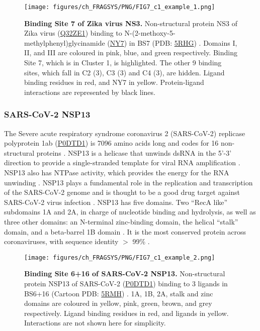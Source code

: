 \begin{figure}[htb!]
    \centering
    \texttt{[image: figures/ch\_FRAGSYS/PNG/FIG7\_c1\_example\_1.png]}
    \caption[Binding Site 7 of Zika virus NS3]{\textbf{Binding Site 7 of Zika virus NS3.} Non-structural protein NS3 of Zika virus (\href{https://www.uniprot.org/uniprotkb/Q32ZE1/entry}{Q32ZE1}) binding to N-(2-methoxy-5-methylphenyl)glycinamide (\href{https://www.ebi.ac.uk/pdbe-srv/pdbechem/chemicalCompound/show/NY7}{NY7}) in BS7 (PDB: \href{https://www.ebi.ac.uk/pdbe/entry/pdb/5RHG}{5RHG}) \cite{PDB_5RHG}. Domains I, II, and III are coloured in pink, blue, and green respectively. Binding Site 7, which is in Cluster 1, is highlighted. The other 9 binding sites, which fall in C2 (3), C3 (3) and C4 (3), are hidden. Ligand binding residues in red, and NY7 in yellow. Protein-ligand interactions are represented by black lines.}
    \label{fig:c1_example_1}
\end{figure}

\vspace{-20pt} %

\subsubsection{SARS-CoV-2 NSP13}

The Severe acute respiratory syndrome coronavirus 2 (SARS-CoV-2) replicase polyprotein 1ab (\href{https://www.uniprot.org/uniprotkb/P0DTD1/entry}{P0DTD1}) is 7096 amino acids long and codes for 16 non-structural proteins \cite{NAQVI_2020_SARSCOV2}. NSP13 is a helicase that unwinds dsRNA in the 5’-3’ direction to provide a single-stranded template for viral RNA amplification \cite{YUE_2022_SARSCOV2}. NSP13 also has NTPase activity, which provides the energy for the RNA unwinding \cite{SHU_2020_SARSCOV2}. NSP13 plays a fundamental role in the replication and transcription of the SARS-CoV-2 genome and is thought to be a good drug target against SARS-CoV-2 virus infection \cite{ZENG_2021_SARSCOV2}. NSP13 has five domains. Two ``RecA like'' subdomains 1A and 2A, in charge of nucleotide binding and hydrolysis, as well as three other domains: an N-terminal zinc-binding domain, the helical ``stalk'' domain, and a beta-barrel 1B domain \cite{ROMEO_2022_SARSCOV2}. It is the most conserved protein across coronaviruses, with sequence identity $>$ 99\% \cite{RICCI_2022_SARSCOV2}.

\begin{figure}[htb!]
    \centering
    \texttt{[image: figures/ch\_FRAGSYS/PNG/FIG7\_c1\_example\_2.png]}
    \caption[Binding Site 6+16 of SARS-CoV-2 NSP13]{\textbf{Binding Site 6+16 of SARS-CoV-2 NSP13.} Non-structural protein NSP13 of SARS-CoV-2 (\href{https://www.uniprot.org/uniprotkb/P0DTD1/entry}{P0DTD1}) binding to 3 ligands in BS6+16 (Cartoon PDB: \href{https://www.ebi.ac.uk/pdbe/entry/pdb/5RMH}{5RMH}) \cite{NEWMAN_2021_SARSCOV2}. 1A, 1B, 2A, stalk and zinc domains are coloured in yellow, pink, green, brown, and grey respectively. Ligand binding residues in red, and ligands in yellow. Interactions are not shown here for simplicity.}
    \label{fig:c1_example_2}
\end{figure}

